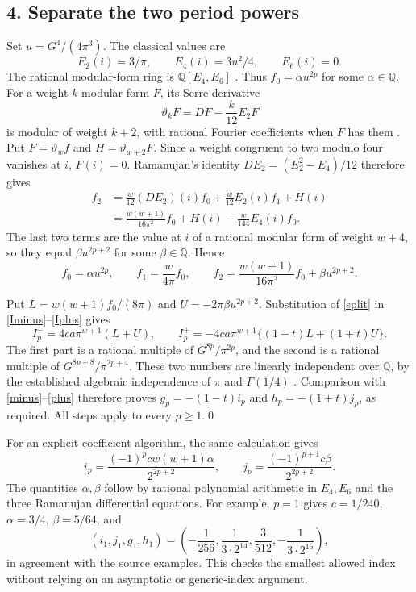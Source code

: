 \documentclass[11pt]{article}
\newcommand{\Q}{\mathbb Q}
\begin{document}
\subsection*{4. Separate the two period powers}
Set $u=G^4/(4\pi^3)$. The classical values are
\[
 E_2(i)=3/\pi,\qquad E_4(i)=3u^2/4,\qquad E_6(i)=0.
\]
The rational modular-form ring is $\Q[E_4,E_6]$
\cite[Proposition 4]{Z}. Thus $f_0=\alpha u^{2p}$ for some
$\alpha\in\Q$. For a weight-$k$ modular form $F$, its Serre derivative
\[
 \vartheta_kF=DF-\frac{k}{12}E_2F
\]
is modular of weight $k+2$, with rational Fourier coefficients
when $F$ has them \cite[Section 5.1]{Z}. Put
$F=\vartheta_w f$ and $H=\vartheta_{w+2}F$.
Since a weight congruent to two modulo four vanishes at $i$,
$F(i)=0$. Ramanujan's identity
$DE_2=(E_2^2-E_4)/12$ therefore gives
\begin{align*}
 f_2
 &=\frac{w}{12}(DE_2)(i)f_0
       +\frac{w}{12}E_2(i)f_1+H(i)\\
 &=\frac{w(w+1)}{16\pi^2}f_0
                 +H(i)-\frac{w}{144}E_4(i)f_0.
\end{align*}
The last two terms are the value at $i$ of a rational modular form
of weight $w+4$, so they equal $\beta u^{2p+2}$ for some
$\beta\in\Q$. Hence
\begin{equation}\label{split}
 f_0=\alpha u^{2p},\qquad f_1=\frac{w}{4\pi}f_0,
 \qquad f_2=\frac{w(w+1)}{16\pi^2}f_0+\beta u^{2p+2}.
\end{equation}

Put $L=w(w+1)f_0/(8\pi)$ and $U=-2\pi\beta u^{2p+2}$.
Substitution of \eqref{split} in \eqref{Iminus}--\eqref{Iplus} gives
\[
 I_p^-=4ca\pi^{w+1}(L+U),\qquad
 I_p^+=-4ca\pi^{w+1}\{(1-t)L+(1+t)U\}.
\]
The first part is a rational multiple of $G^{8p}/\pi^{2p}$,
and the second is a rational multiple of $G^{8p+8}/\pi^{2p+4}$.
These two numbers are linearly independent over $\Q$, by the
established algebraic independence of $\pi$ and $\Gamma(1/4)$
\cite[p.~85]{Z}. Comparison with \eqref{minus}--\eqref{plus}
therefore proves $g_p=-(1-t)i_p$ and $h_p=-(1+t)j_p$, as required.
All steps apply to every $p\ge1$.\qed

For an explicit coefficient algorithm, the same calculation gives
\[
 i_p=\frac{(-1)^p c w(w+1)\alpha}{2^{2p+2}},\qquad
 j_p=\frac{(-1)^{p+1}c\beta}{2^{2p+2}}.
\]
The quantities $\alpha,\beta$ follow by rational polynomial
arithmetic in $E_4,E_6$ and the three Ramanujan differential equations.
For example, $p=1$ gives $c=1/240$, $\alpha=3/4$, $\beta=5/64$, and
\[
 (i_1,j_1,g_1,h_1)=
 \left(-\frac1{256},\frac1{3\cdot2^{14}},
              \frac3{512},-\frac1{3\cdot2^{15}}\right),
\]
in agreement with the source examples. This checks the smallest
allowed index without relying on an asymptotic or generic-index argument.
\end{document}
